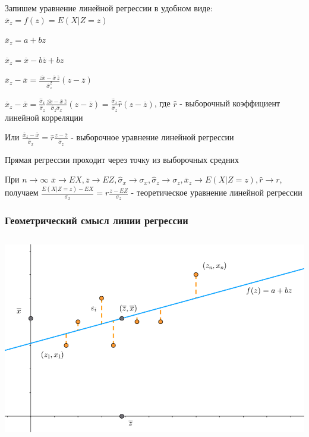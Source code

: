 \documentclass[12pt]{article}
\begin{document}
Запишем уравнение линейной регрессии в удобном виде: $\overline{x}_z = f(z) = E(X | Z = z)$

$\overline{x}_z = a + bz$

$\overline{x}_z = \overline{x} - b \overline{z} + bz$

$\overline{x}_z - \overline{x} = \frac{\overline{z x} - \overline{x} \, \overline{z}}{\hat \sigma^2_z} (z - \overline{z})$

$\overline{x}_z - \overline{x} = \frac{\hat \sigma_x}{\hat \sigma_z} \frac{\overline{z x} - \overline{x} \, \overline{z}}{\hat \sigma_z \hat \sigma_x} (z - \overline{z}) = 
\frac{\hat \sigma_x}{\hat \sigma_z} \hat r (z - \overline{z})$, где $\hat r$ - выборочный коэффициент линейной корреляции

Или $\frac{\overline{x}_z - \overline{x}}{\hat \sigma_x} = \hat r \frac{z - \overline{z}}{\hat \sigma_z}$ - выборочное уравнение линейной регрессии

\Nota Прямая регрессии проходит через точку из выборочных средних

\Notas При $n \to \infty$ $\overline{x} \longrightarrow EX, \overline{z} \longrightarrow EZ, \hat \sigma_x \longrightarrow \sigma_x,
\hat \sigma_z \longrightarrow \sigma_z, \overline{x}_z \longrightarrow E(X | Z = z), \hat r \longrightarrow r$, получаем 
$\frac{E(X | Z = z) - EX}{\sigma_x} = r \frac{z - EZ}{\sigma_z}$ - теоретическое уравнение линейной регрессии

\subsubsection{Геометрический смысл линии регрессии}


\begin{center}
    \includegraphics[height=9cm]{mathstat/images/mathstat_2025_04_08_1}
\end{center}
\end{document}
